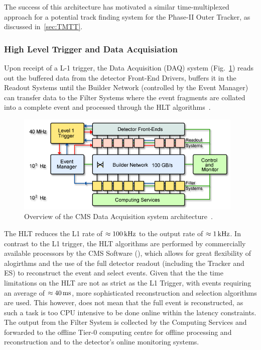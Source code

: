 The success of this architecture has motivated a similar time-multiplexed approach for a potential track finding system for the Phase-II Outer Tracker, as discussed in~\ref{sec:TMTT}.

\subsubsection{High Level Trigger and Data Acquisiation}\label{paragraph:HLT}
Upon receipt of a L-1 trigger, the Data Acquisition (DAQ) system (Fig.~\ref{fig:DAQ}) reads out the buffered data from the detector Front-End Drivers, buffers it in the Readout Systems until the Builder Network (controlled by the Event Manager) can transfer data to the Filter Systems where the event fragments are collated into a complete event and processed through the HLT algorithms~\cite{Sphicas:2002gg}. 

\begin{figure}[htbp]
\begin{center}
\includegraphics[width=0.97\textwidth]{figs/cms/CMS_DAQ.jpg}
\caption{Overview of the CMS Data Acquisition system architecture~\cite{Sphicas:2002gg}.}
\label{fig:DAQ}
\end{center}
\end{figure}

The HLT reduces the L1 rate of $\approx 100\text{\,kHz}$ to the output rate of $\approx 1\text{\,kHz}$.
In contrast to the L1 trigger, the HLT algorithms are performed by commercially available processors by the CMS Software (\CMSSW), which allows for great flexibility of alogirthms and the use of the full detector readout (including the Tracker and ES) to reconstruct the event and select events.
Given that the the time limitations on the HLT are not as strict as the L1 Trigger, with events requiring an average of $\approx 40\text{\,ms}$, more sophisticated reconstruction and selection algorithms are used.
This however, does not mean that the full event is reconstructed, as such a task is too CPU intensive to be done online within the latency constraints.
The output from the Filter System is collected by the Computing Services and forwarded to the offline Tier-0 computing centre for offline processing and reconstruction and to the detector's online monitoring systems.
